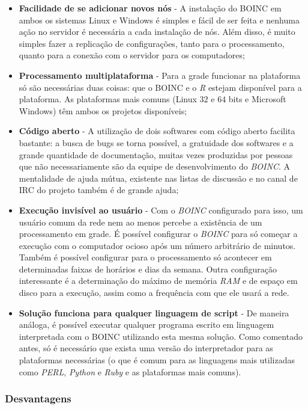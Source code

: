 \begin{itemize}
  \item \textbf{Facilidade de se adicionar novos nós} - A instalação do BOINC em ambos os sistemas Linux e Windows é simples
e fácil de ser feita e nenhuma ação no servidor é necessária a cada instalação de nós. Além disso, é muito simples fazer
a replicação de configurações, tanto para o processamento, quanto para a conexão com o servidor para os computadores;
  \item \textbf{Processamento multiplataforma} - Para a grade funcionar na plataforma só são necessárias duas coisas: 
que o BOINC e o \emph{R} estejam disponível para a plataforma. As plataformas mais comuns 
(Linux $32$ e $64$ bits e Microsoft Windows) têm ambos os projetos disponíveis;
  \item \textbf{Código aberto} - A utilização de dois softwares com código aberto facilita bastante: a 
busca de bugs se torna possível, a gratuidade dos softwares e a grande quantidade de documentação, muitas vezes produzidas por
pessoas que não necessariamente são da equipe de desenvolvimento do \emph{BOINC}. A mentalidade de ajuda mútua, existente nas
listas de discussão e no canal de IRC do projeto também é de grande ajuda; 
  \item \textbf{Execução invisível ao usuário} - Com o \emph{BOINC} configurado para isso, um usuário comum da rede nem ao menos 
percebe a existência de um processamento em grade. É possível configurar o \emph{BOINC} para só começar a execução com o computador ocioso
após um número arbitrário de minutos. Também é possível configurar para o processamento só acontecer em determinadas 
faixas de horários e dias da semana. Outra configuração interessante é a determinação do máximo de memória 
\emph{RAM} e de espaço em disco para a execução, assim como a frequência com que ele usará a rede. 
  \item \textbf{Solução funciona para qualquer linguagem de script} - De maneira análoga, é possível executar qualquer programa escrito em 
linguagem interpretada com o BOINC utilizando esta mesma solução. Como comentado antes, só é necessário que exista uma versão do interpretador
para as plataformas necessárias (o que é comum para as linguagens mais utilizadas como \emph{PERL}, \emph{Python} e 
\emph{Ruby} e as plataformas mais comuns). 

\end{itemize}

\subsubsection{Desvantagens}

